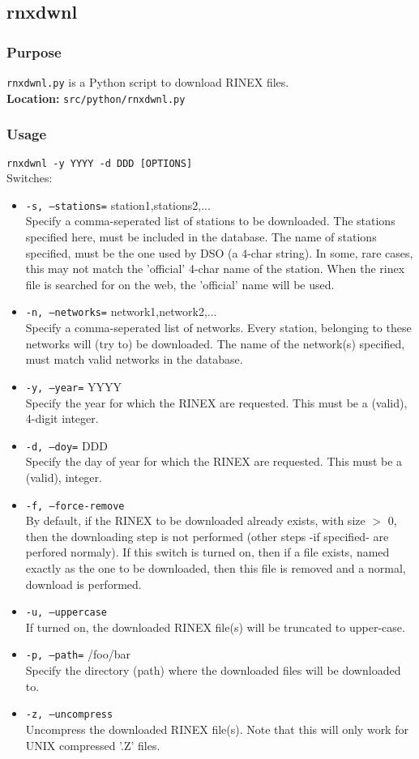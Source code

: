 \subsection{rnxdwnl}
\label{rnxdwnl}

\subsubsection{Purpose}
\texttt{rnxdwnl.py} is a Python script to download RINEX files.\\
\textbf{Location:} \texttt{src/python/rnxdwnl.py}

\subsubsection{Usage}
\texttt{rnxdwnl -y YYYY -d DDD [OPTIONS]}\\

Switches:
\begin{itemize}
\item \texttt{-s, --stations=} station1,stations2,...\\
Specify a comma-seperated list of stations to be downloaded. The stations specified here, 
must be included in the database. The name of stations specified, must be the one
used by DSO (a 4-char string). In some, rare cases, this may not match the 'official'
4-char name of the station. When the rinex file is searched for on the web, the
'official' name will be used.
\item \texttt{-n, --networks=} network1,network2,...\\
Specify a comma-seperated list of networks. Every station, belonging to these
networks will (try to) be downloaded. The name of the network(s) specified, must 
match valid networks in the database.
\item \texttt{-y, --year=} YYYY\\
Specify the year for which the RINEX are requested. This must be a (valid),
4-digit integer.
\item \texttt{-d, --doy=} DDD\\
Specify the day of year for which the RINEX are requested. This must be a (valid), integer.
\item \texttt{-f, --force-remove}\\
By default, if the RINEX to be downloaded already exists, with size $>$ 0, then
the downloading step is not performed (other steps -if specified- are perfored normaly).
If this switch is turned on, then if a file exists,
named exactly as the one to be downloaded, then this file is removed and a normal,
download is performed.
\item \texttt{-u, --uppercase}\\
If turned on, the downloaded RINEX file(s) will be truncated to upper-case.
\item \texttt{-p, --path=} /foo/bar\\
Specify the directory (path) where the downloaded files will be downloaded to.
\item \texttt{-z, --uncompress}\\
Uncompress the downloaded RINEX file(s). Note that this will only work for UNIX compressed '.Z' files.
\end{itemize}

